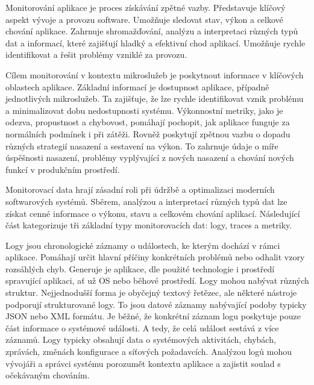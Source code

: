 


Monitorování aplikace je proces získávání zpětné vazby. Představuje klíčový aspekt vývoje a provozu software. \cite{Riedesel2021} Umožňuje sledovat stav, výkon a celkové chování aplikace. Zahrnuje shromažďování, analýzu a interpretaci různých typů dat a informací, které zajišťují hladký a efektivní chod aplikací. Umožňuje rychle identifikovat a řešit problémy vzniklé za provozu. 


Cílem monitorování v kontextu mikroslužeb je poskytnout informace v klíčových oblastech aplikace. Základní informací je dostupnost aplikace, případně jednotlivých mikroslužeb. Ta zajišťuje, že lze rychle identifikovat vznik problému a minimalizovat dobu nedostupnosti systému. Výkonnostní metriky, jako je odezva, propustnost a chybovost, pomáhají pochopit, jak aplikace funguje za normálních podmínek i při zátěži. \cite{Riedesel2021} Rovněž poskytují zpětnou vazbu o dopadu různých strategií nasazení a sestavení na výkon. To zahrnuje údaje o míře úspěšnosti nasazení, problémy vyplývající z nových nasazení a chování nových funkcí v produkčním prostředí.


Monitorovací data hrají zásadní roli při údržbě a optimalizaci moderních softwarových systémů. Sběrem, analýzou a interpretací různých typů dat lze získat cenné informace o výkonu, stavu a celkovém chování aplikací. Následující část kategorizuje tři základní typy monitorovacích dat: logy, traces a metriky. \cite{Majors2022}


Logy jsou chronologické záznamy o událostech, ke kterým dochází v rámci aplikace. Pomáhají určit hlavní příčiny konkrétních problémů nebo odhalit vzory rozsáhlých chyb. Generuje je aplikace, dle použité technologie i prostředí spravující aplikaci, ať už OS nebo běhové prostředí. Logy mohou nabývat různých struktur. Nejjednodušší forma je obyčejný textový řetězec, ale některé nástroje podporují strukturované logy. To jsou datové záznamy nabývající podoby typicky JSON nebo XML formátu. Je běžné, že konkrétní záznam logu poskytuje pouze část informace o systémové události. A tedy, že celá událost sestává z více záznamů. \cite{Majors2022} Logy typicky obsahují data o systémových aktivitách, chybách, zprávách, změnách konfigurace a síťových požadavcích. Analýzou logů mohou vývojáři a správci systému porozumět kontextu aplikace a zajistit soulad s očekávaným chováním. \cite{Majors2022}

